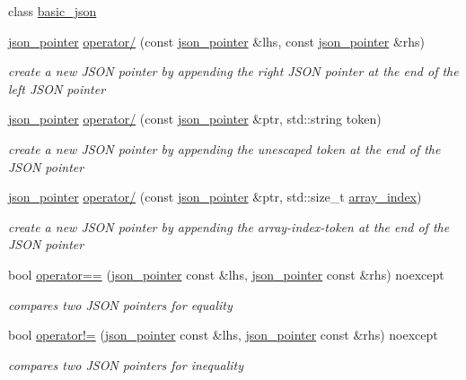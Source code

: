 \begin{DoxyCompactItemize}
\item 
class \hyperlink{classnlohmann_1_1json__pointer_ada3100cdb8700566051828f1355fa745}{basic\+\_\+json}
\item 
\hyperlink{classnlohmann_1_1json__pointer}{json\+\_\+pointer} \hyperlink{classnlohmann_1_1json__pointer_a90a11fe6c7f37b1746a3ff9cb24b0d53}{operator/} (const \hyperlink{classnlohmann_1_1json__pointer}{json\+\_\+pointer} \&lhs, const \hyperlink{classnlohmann_1_1json__pointer}{json\+\_\+pointer} \&rhs)
\begin{DoxyCompactList}\small\item\em create a new J\+S\+ON pointer by appending the right J\+S\+ON pointer at the end of the left J\+S\+ON pointer \end{DoxyCompactList}\item 
\hyperlink{classnlohmann_1_1json__pointer}{json\+\_\+pointer} \hyperlink{classnlohmann_1_1json__pointer_a926c9065dbed1bedc17857a813f7a46f}{operator/} (const \hyperlink{classnlohmann_1_1json__pointer}{json\+\_\+pointer} \&ptr, std\+::string token)
\begin{DoxyCompactList}\small\item\em create a new J\+S\+ON pointer by appending the unescaped token at the end of the J\+S\+ON pointer \end{DoxyCompactList}\item 
\hyperlink{classnlohmann_1_1json__pointer}{json\+\_\+pointer} \hyperlink{classnlohmann_1_1json__pointer_a9f6bc6f4d4668b4e9a19d8b8ac29da4f}{operator/} (const \hyperlink{classnlohmann_1_1json__pointer}{json\+\_\+pointer} \&ptr, std\+::size\+\_\+t \hyperlink{classnlohmann_1_1json__pointer_ac53f5b79dd91da78743c437832f57ce4}{array\+\_\+index})
\begin{DoxyCompactList}\small\item\em create a new J\+S\+ON pointer by appending the array-\/index-\/token at the end of the J\+S\+ON pointer \end{DoxyCompactList}\item 
bool \hyperlink{classnlohmann_1_1json__pointer_a4667ef558c8c3f8a646bfda0c6654653}{operator==} (\hyperlink{classnlohmann_1_1json__pointer}{json\+\_\+pointer} const \&lhs, \hyperlink{classnlohmann_1_1json__pointer}{json\+\_\+pointer} const \&rhs) noexcept
\begin{DoxyCompactList}\small\item\em compares two J\+S\+ON pointers for equality \end{DoxyCompactList}\item 
bool \hyperlink{classnlohmann_1_1json__pointer_a6779edcf28e6f018a3bbb29c0b4b5e1e}{operator!=} (\hyperlink{classnlohmann_1_1json__pointer}{json\+\_\+pointer} const \&lhs, \hyperlink{classnlohmann_1_1json__pointer}{json\+\_\+pointer} const \&rhs) noexcept
\begin{DoxyCompactList}\small\item\em compares two J\+S\+ON pointers for inequality \end{DoxyCompactList}\end{DoxyCompactItemize}


